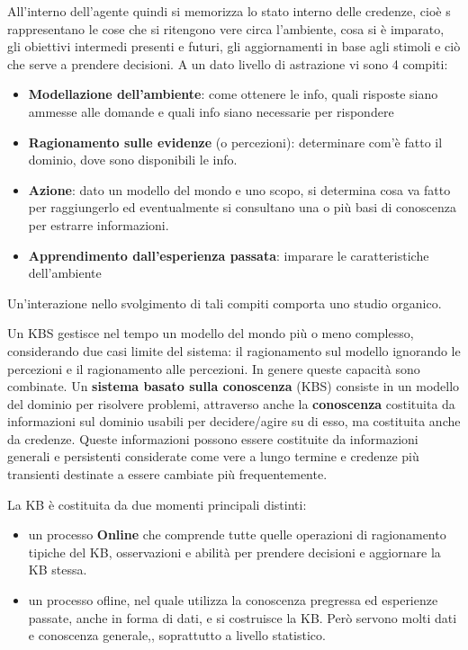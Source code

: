 \documentclass[a4paper]{extarticle}
\begin{document}
All'interno dell'agente quindi si memorizza lo stato interno delle credenze, cioè s rappresentano le cose che si ritengono vere circa l'ambiente, cosa si è imparato, gli obiettivi intermedi presenti e futuri, gli aggiornamenti in base agli stimoli e ciò che serve a prendere decisioni. A un dato livello di astrazione vi sono 4 compiti:
\begin{itemize}
\item \textbf{Modellazione dell'ambiente}: come ottenere le info, quali risposte siano ammesse alle domande e quali info siano necessarie per rispondere
\item \textbf{Ragionamento sulle evidenze} (o percezioni): determinare com'è fatto il dominio, dove sono disponibili le info.
\item \textbf{Azione}: dato un modello del mondo e uno scopo, si determina cosa va fatto per raggiungerlo ed eventualmente si consultano una o più basi di conoscenza per estrarre informazioni.
\item \textbf{Apprendimento dall'esperienza passata}: imparare le caratteristiche dell'ambiente
\end{itemize}
Un'interazione nello svolgimento di tali compiti comporta uno studio organico.

Un KBS gestisce nel tempo un modello del mondo più o meno complesso, considerando due casi limite del sistema: il ragionamento sul modello ignorando le percezioni e il ragionamento alle percezioni. In genere queste capacità sono combinate. Un \textbf{sistema basato sulla conoscenza} (KBS) consiste in un modello del dominio per risolvere problemi, attraverso anche la \textbf{conoscenza} costituita da informazioni sul dominio usabili per decidere/agire su di esso, ma costituita anche da credenze. Queste informazioni possono essere costituite da informazioni generali e persistenti considerate come vere a lungo termine e credenze più transienti destinate a essere cambiate più frequentemente.

La KB è costituita da due momenti principali distinti:
\begin{itemize}
\item un processo \textbf{Online} che comprende tutte quelle operazioni di ragionamento tipiche del KB, osservazioni e abilità per prendere decisioni e aggiornare la KB stessa. 
\item un processo ofline, nel quale utilizza la conoscenza pregressa ed esperienze passate, anche in forma di dati, e si costruisce la KB. Però servono molti dati e conoscenza generale,, soprattutto a livello statistico.
\end{itemize}
\end{document}
